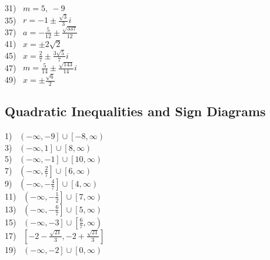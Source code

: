 \documentclass[12pt]{book}
\theoremstyle{definition}
\begin{document}
\begin{multicols}{3}
  31)~ $m=5,~-9$\\
  35)~ $r=-1\pm\frac{\sqrt{3}}{3}i$\\
  37)~ $a=-\frac{5}{12}\pm\frac{\sqrt{337}}{12}$\\
  41)~ $x=\pm 2\sqrt{2}$\\
  45)~ $x=\frac{2}{7}\pm\frac{3\sqrt{5}}{7}i$\\
  47)~ $m=\frac{5}{14}\pm\frac{\sqrt{143}}{14}i$\\
  49)~ $x=\pm\frac{\sqrt{6}}{2}$
\end{multicols}

\subsection*{Quadratic Inequalities and Sign Diagrams}

\begin{multicols}{3}
1)~ $\left(-\infty,-9\right]\cup\left[-8,\infty\right)$\\ 
3)~ $\left(-\infty,1\right]\cup\left[8,\infty\right)$\\
5)~ $\left(-\infty,-1\right]\cup\left[10,\infty\right)$\\
7)~ $\left(-\infty,\frac{2}{7}\right]\cup\left[6,\infty\right)$\\
9)~ $\left(-\infty,-\frac{4}{7}\right]\cup\left[4,\infty\right)$\\
11)~ $\left(-\infty,-\frac{1}{2}\right]\cup\left[7,\infty\right)$\\
13)~ $\left(-\infty,-\frac{6}{7}\right]\cup\left[5,\infty\right)$\\
15)~ $\left(-\infty,-3\right]\cup\left[\frac{6}{7},\infty\right)$\\
17)~ $\left[-2-\frac{\sqrt{21}}{3},-2+\frac{\sqrt{21}}{3}\right]$\\ 
19)~ $\left(-\infty,-2\right]\cup\left[0,\infty\right)$
\end{multicols}
\end{document}

